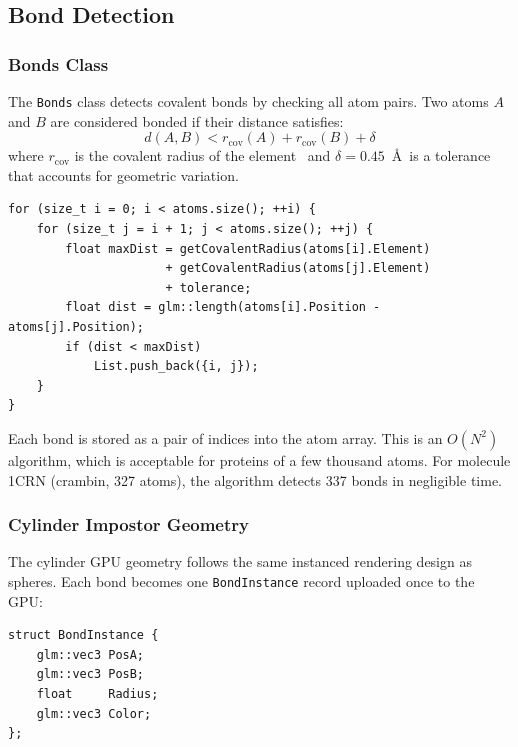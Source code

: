 \documentclass[12pt, a4paper]{article}
\begin{document}
\subsection{Bond Detection}

\subsubsection{Bonds Class}

The \texttt{Bonds} class detects covalent bonds by checking all atom pairs. Two atoms $A$ and $B$ are considered bonded if their distance satisfies:
\begin{equation}
    d(A, B) < r_{\mathrm{cov}}(A) + r_{\mathrm{cov}}(B) + \delta
    \label{eq:bond}
\end{equation}
where $r_{\mathrm{cov}}$ is the covalent radius of the element~\cite{alvarez2008} and $\delta = 0.45$~\AA\ is a tolerance that accounts for geometric variation.

\begin{lstlisting}[style=cppstyle, caption={Pairwise bond detection (Bonds.cpp)}]
for (size_t i = 0; i < atoms.size(); ++i) {
    for (size_t j = i + 1; j < atoms.size(); ++j) {
        float maxDist = getCovalentRadius(atoms[i].Element)
                      + getCovalentRadius(atoms[j].Element)
                      + tolerance;
        float dist = glm::length(atoms[i].Position - atoms[j].Position);
        if (dist < maxDist)
            List.push_back({i, j});
    }
}
\end{lstlisting}

Each bond is stored as a pair of indices into the atom array. This is an $O(N^2)$ algorithm, which is acceptable for proteins of a few thousand atoms. For molecule 1CRN (crambin, 327 atoms), the algorithm detects 337 bonds in negligible time.

\subsubsection{Cylinder Impostor Geometry}
\label{sec:cylcpu}

The cylinder GPU geometry follows the same instanced rendering design as spheres. Each bond becomes one \texttt{BondInstance} record uploaded once to the GPU:

\begin{lstlisting}[style=cppstyle, caption={BondInstance struct (one record per bond)}]
struct BondInstance {
    glm::vec3 PosA;   
    glm::vec3 PosB; 
    float     Radius; 
    glm::vec3 Color; 
};
\end{lstlisting}
\end{document}

